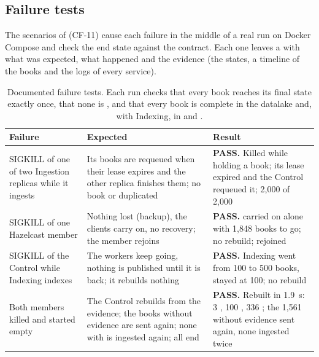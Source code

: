 \subsection{Failure tests}
\label{sec:failure-tests}

The scenarios of  (CF-11) cause each failure in the middle of a real run on Docker Compose and check
the end state against the contract. Each one leaves a  with what was expected, what happened and the
evidence (the states, a timeline of the books and the logs of every service).

\begin{table}[H]
\centering\small
\begin{tabularx}{\linewidth}{@{}L{3.3cm}XL{3.4cm}@{}}
\toprule
\textbf{Failure} & \textbf{Expected} & \textbf{Result} \\
\midrule
SIGKILL of one of two Ingestion replicas while it ingests & Its books are requeued when their lease expires and the
  other replica finishes them; no book  or duplicated & \textbf{PASS.} Killed while holding a book; its lease expired and the Control requeued it; 2,000 of 2,000  \\
SIGKILL of one Hazelcast member & Nothing lost (backup), the clients carry on, no recovery; the member rejoins &
  \textbf{PASS.}  carried on alone with 1,848 books to go; no rebuild;  rejoined \\
SIGKILL of the Control while Indexing indexes & The workers keep going, nothing is published until it is back; it rebuilds
  nothing & \textbf{PASS.} Indexing went from 100 to 500 books,  stayed at 100; no rebuild \\
Both members killed and started empty & The Control rebuilds  from the evidence; the books without
  evidence are sent again; none with  is ingested again; all end  &
  \textbf{PASS.} Rebuilt in 1.9~s: 3 , 100 , 336 ; the 1,561 without evidence sent again, none ingested twice \\
\bottomrule
\end{tabularx}
\caption{Documented failure tests. Each run checks that every book reaches its final state exactly once, that none is
, and that every book is complete in the datalake and, with Indexing, in  and
.}
\label{tab:failure-tests}
\end{table}

